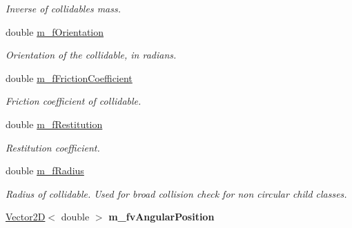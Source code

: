 \begin{DoxyCompactItemize}
\begin{DoxyCompactList}\small\item\em Inverse of collidable\textquotesingle{}s mass. \end{DoxyCompactList}\item 
\hypertarget{class_collidable_af9cea5a59438b7b3604b8c7aa023380f}{}double \hyperlink{class_collidable_af9cea5a59438b7b3604b8c7aa023380f}{m\+\_\+f\+Orientation}\label{class_collidable_af9cea5a59438b7b3604b8c7aa023380f}

\begin{DoxyCompactList}\small\item\em Orientation of the collidable, in radians. \end{DoxyCompactList}\item 
\hypertarget{class_collidable_a7d243411e75ff019385dea0a4ff153e9}{}double \hyperlink{class_collidable_a7d243411e75ff019385dea0a4ff153e9}{m\+\_\+f\+Friction\+Coefficient}\label{class_collidable_a7d243411e75ff019385dea0a4ff153e9}

\begin{DoxyCompactList}\small\item\em Friction coefficient of collidable. \end{DoxyCompactList}\item 
\hypertarget{class_collidable_a17a452821ac1a880542e596fbfcaae6a}{}double \hyperlink{class_collidable_a17a452821ac1a880542e596fbfcaae6a}{m\+\_\+f\+Restitution}\label{class_collidable_a17a452821ac1a880542e596fbfcaae6a}

\begin{DoxyCompactList}\small\item\em Restitution coefficient. \end{DoxyCompactList}\item 
\hypertarget{class_collidable_a1dde2844bbacaaf23b8b0652bf5ce906}{}double \hyperlink{class_collidable_a1dde2844bbacaaf23b8b0652bf5ce906}{m\+\_\+f\+Radius}\label{class_collidable_a1dde2844bbacaaf23b8b0652bf5ce906}

\begin{DoxyCompactList}\small\item\em Radius of collidable. Used for broad collision check for non circular child classes. \end{DoxyCompactList}\item 
\hypertarget{class_collidable_a02c0b29fccb4af356d56b65dc3d86542}{}\hyperlink{class_vector2_d}{Vector2\+D}$<$ double $>$ {\bfseries m\+\_\+fv\+Angular\+Position}\label{class_collidable_a02c0b29fccb4af356d56b65dc3d86542}


\end{DoxyCompactItemize}
